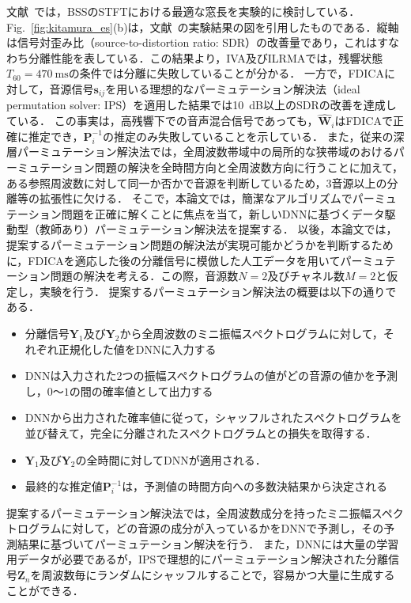 文献~\cite{EU}では，BSSのSTFTにおける最適な窓長を実験的に検討している．
Fig.~\ref{fig:kitamura_es}(b)は，文献~\cite{EU}の実験結果の図を引用したものである．縦軸は信号対歪み比（source-to-distortion ratio: SDR）\cite{BSSEval}の改善量であり，これはすなわち分離性能を表している．この結果より，IVA及びILRMAでは，残響状態$T_{60} = 470~\mathrm{ms}$の条件では分離に失敗していることが分かる．
一方で，FDICAに対して，音源信号$\bm{s}_{ij}$を用いる理想的なパーミュテーション解決法（ideal permutation solver: IPS）を適用した結果では10~dB以上のSDRの改善を達成している．
この事実は，高残響下での音声混合信号であっても，$\hat{\bm{W}}_i$はFDICAで正確に推定でき，$\bm{P}_i^{-1}$の推定のみ失敗していることを示している．
また，従来の深層パーミュテーション解決法では，全周波数帯域中の局所的な狭帯域のおけるパーミュテーション問題の解決を全時間方向と全周波数方向に行うことに加えて，ある参照周波数に対して同一か否かで音源を判断しているため，3音源以上の分離等の拡張性に欠ける．
そこで，本論文では，簡潔なアルゴリズムでパーミュテーション問題を正確に解くことに焦点を当て，新しいDNNに基づくデータ駆動型（教師あり）パーミュテーション解決法を提案する．
以後，本論文では，提案するパーミュテーション問題の解決法が実現可能かどうかを判断するために，FDICAを適応した後の分離信号に模倣した人工データを用いてパーミュテーション問題の解決を考える．この際，音源数$N=2$及びチャネル数$M=2$と仮定し，実験を行う．
提案するパーミュテーション解決法の概要は以下の通りである．
\begin{itemize}
    \item 分離信号$\bm{Y}_1$及び$\bm{Y}_2$から全周波数のミニ振幅スペクトログラムに対して，それぞれ正規化した値をDNNに入力する
    \item DNNは入力された2つの振幅スペクトログラムの値がどの音源の値かを予測し，$0$〜$1$の間の確率値として出力する
    \item DNNから出力された確率値に従って，シャッフルされたスペクトログラムを並び替えて，完全に分離されたスペクトログラムとの損失を取得する．
    \item $\bm{Y}_1$及び$\bm{Y}_2$の全時間に対してDNNが適用される．
    \item 最終的な推定値$\bm{P}_i^{-1}$は，予測値の時間方向への多数決結果から決定される
\end{itemize}

提案するパーミュテーション解決法では，全周波数成分を持ったミニ振幅スペクトログラムに対して，どの音源の成分が入っているかをDNNで予測し，その予測結果に基づいてパーミュテーション解決を行う．
また，DNNには大量の学習用データが必要であるが，IPSで理想的にパーミュテーション解決された分離信号$\bm{Z}_n$を周波数毎にランダムにシャッフルすることで，容易かつ大量に生成することができる．

